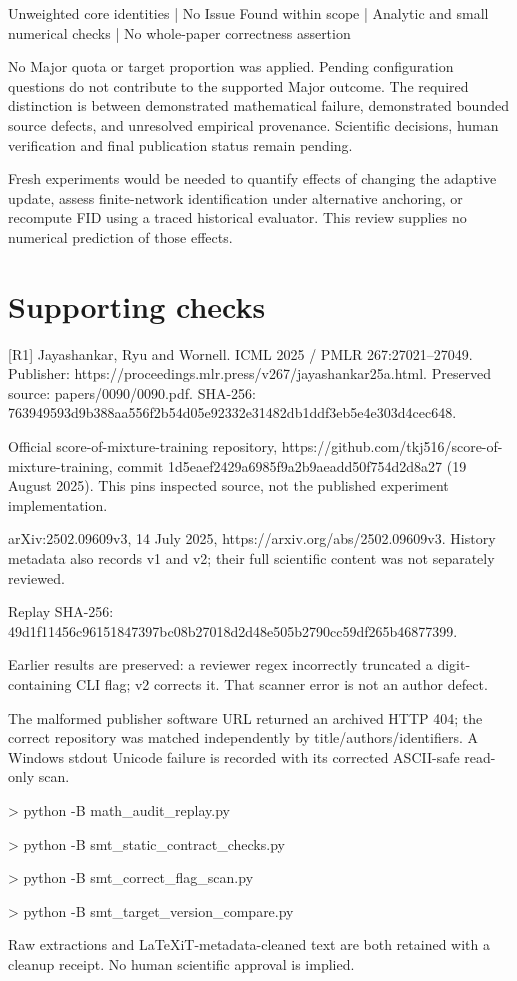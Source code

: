 \documentclass[10pt]{article}
\begin{document}
Unweighted core identities | No Issue Found within scope | Analytic and small numerical checks | No whole-paper correctness assertion\par
No Major quota or target proportion was applied. Pending configuration questions do not contribute to the supported Major outcome. The required distinction is between demonstrated mathematical failure, demonstrated bounded source defects, and unresolved empirical provenance. Scientific decisions, human verification and final publication status remain pending.\par
Fresh experiments would be needed to quantify effects of changing the adaptive update, assess finite-network identification under alternative anchoring, or recompute FID using a traced historical evaluator. This review supplies no numerical prediction of those effects.\par
\section*{Supporting checks}
[R1] Jayashankar, Ryu and Wornell. ICML 2025 / PMLR 267:27021–27049. Publisher: https://proceedings.mlr.press/v267/jayashankar25a.html. Preserved source: papers/0090/0090.pdf. SHA-256: 763949593d9b388aa556f2b54d05e92332e31482db1ddf3eb5e4e303d4cec648.\par
[R2] Official score-of-mixture-training repository, https://github.com/tkj516/score-of-mixture-training, commit 1d5eaef2429a6985f9a2b9aeadd50f754d2d8a27 (19 August 2025). This pins inspected source, not the published experiment implementation.\par
[R3] arXiv:2502.09609v3, 14 July 2025, https://arxiv.org/abs/2502.09609v3. History metadata also records v1 and v2; their full scientific content was not separately reviewed.\par
Replay SHA-256: 49d1f11456c96151847397bc08b27018d2d48e505b2790cc59df265b46877399.\par
Earlier results are preserved: a reviewer regex incorrectly truncated a digit-containing CLI flag; v2 corrects it. That scanner error is not an author defect.\par
The malformed publisher software URL returned an archived HTTP 404; the correct repository was matched independently by title/authors/identifiers. A Windows stdout Unicode failure is recorded with its corrected ASCII-safe read-only scan.\par
> python -B math\_audit\_replay.py\par
> python -B smt\_static\_contract\_checks.py\par
> python -B smt\_correct\_flag\_scan.py\par
> python -B smt\_target\_version\_compare.py\par
Raw extractions and LaTeXiT-metadata-cleaned text are both retained with a cleanup receipt. No human scientific approval is implied.\par
\end{document}
